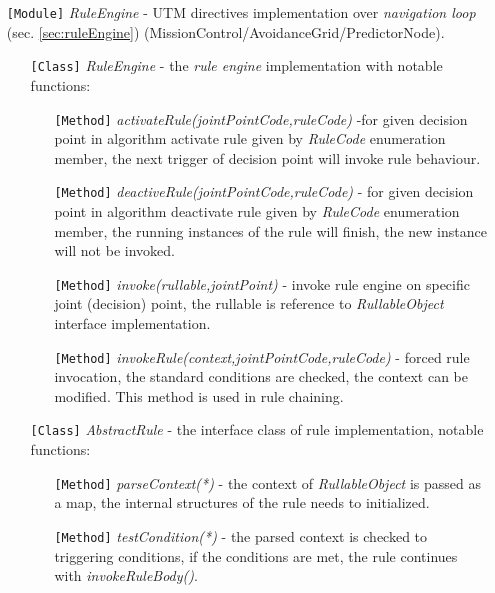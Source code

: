 \begin{itemize}
    \item[\texttt{[Module]}] \emph{RuleEngine} - UTM directives implementation over \emph{navigation loop} (sec. \ref{sec:ruleEngine}) (MissionControl/AvoidanceGrid/PredictorNode).
    \begin{itemize}
        \item[\texttt{[Class]}] \emph{RuleEngine} - the \emph{rule engine} implementation with notable functions:
        \begin{itemize}
            \item[\texttt{[Method]}] \emph{activateRule(jointPointCode,ruleCode)} -for given decision point in algorithm activate rule given by \emph{RuleCode} enumeration member, the next trigger of decision point will invoke rule behaviour. 
            
            \item[\texttt{[Method]}] \emph{deactiveRule(jointPointCode,ruleCode)} - for given decision point in algorithm deactivate rule given by \emph{RuleCode} enumeration member, the running instances of the rule will finish, the new instance will not be invoked. 
            
            \item[\texttt{[Method]}] \emph{invoke(rullable,jointPoint)} - invoke rule engine on specific joint (decision) point, the rullable is reference to \emph{RullableObject} interface implementation. 
            
            \item[\texttt{[Method]}] \emph{invokeRule(context,jointPointCode,ruleCode)} - forced rule invocation, the standard conditions are checked, the context can be modified. This method is used in rule chaining.
        \end{itemize}
        
        \item[\texttt{[Class]}] \emph{AbstractRule} - the interface class of rule implementation, notable functions:
        \begin{itemize}
            \item[\texttt{[Method]}] \emph{parseContext(*)} - the context of \emph{RullableObject} is passed as a map, the internal structures of the rule needs to initialized.
            
            \item[\texttt{[Method]}] \emph{testCondition(*)} - the parsed context is checked to triggering conditions, if the conditions are met, the rule continues with \emph{invokeRuleBody()}.
            

\end{itemize}
\end{itemize}
\end{itemize}
